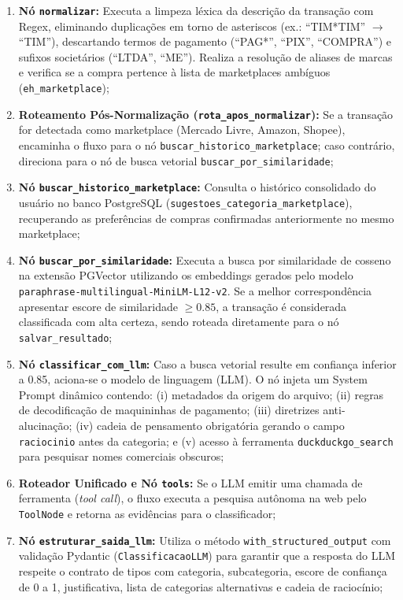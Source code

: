 \documentclass[
	12pt,				
	openright,			
	oneside,			
	a4paper,			
	english,			
	brazil				
	]{abntex2}
\begin{document}
\begin{enumerate}
    \item \textbf{Nó \texttt{normalizar}:} Executa a limpeza léxica da descrição da transação com Regex, eliminando duplicações em torno de asteriscos (ex.: ``TIM*TIM'' $\to$ ``TIM''), descartando termos de pagamento (``PAG*'', ``PIX'', ``COMPRA'') e sufixos societários (``LTDA'', ``ME''). Realiza a resolução de aliases de marcas e verifica se a compra pertence à lista de marketplaces ambíguos (\texttt{eh\_marketplace});
    \item \textbf{Roteamento Pós-Normalização (\texttt{rota\_apos\_normalizar}):} Se a transação for detectada como marketplace (Mercado Livre, Amazon, Shopee), encaminha o fluxo para o nó \texttt{buscar\_historico\_marketplace}; caso contrário, direciona para o nó de busca vetorial \texttt{buscar\_por\_similaridade};
    \item \textbf{Nó \texttt{buscar\_historico\_marketplace}:} Consulta o histórico consolidado do usuário no banco PostgreSQL (\texttt{sugestoes\_categoria\_marketplace}), recuperando as preferências de compras confirmadas anteriormente no mesmo marketplace;
    \item \textbf{Nó \texttt{buscar\_por\_similaridade}:} Executa a busca por similaridade de cosseno na extensão PGVector utilizando os embeddings gerados pelo modelo \texttt{paraphrase-multilingual-MiniLM-L12-v2}. Se a melhor correspondência apresentar escore de similaridade $\ge 0.85$, a transação é considerada classificada com alta certeza, sendo roteada diretamente para o nó \texttt{salvar\_resultado};
    \item \textbf{Nó \texttt{classificar\_com\_llm}:} Caso a busca vetorial resulte em confiança inferior a 0.85, aciona-se o modelo de linguagem (LLM). O nó injeta um System Prompt dinâmico contendo: (i) metadados da origem do arquivo; (ii) regras de decodificação de maquininhas de pagamento; (iii) diretrizes anti-alucinação; (iv) cadeia de pensamento obrigatória gerando o campo \texttt{raciocinio} antes da categoria; e (v) acesso à ferramenta \texttt{duckduckgo\_search} para pesquisar nomes comerciais obscuros;
    \item \textbf{Roteador Unificado e Nó \texttt{tools}:} Se o LLM emitir uma chamada de ferramenta (\textit{tool call}), o fluxo executa a pesquisa autônoma na web pelo \texttt{ToolNode} e retorna as evidências para o classificador;
    \item \textbf{Nó \texttt{estruturar\_saida\_llm}:} Utiliza o método \texttt{with\_structured\_output} com validação Pydantic (\texttt{ClassificacaoLLM}) para garantir que a resposta do LLM respeite o contrato de tipos com categoria, subcategoria, escore de confiança de 0 a 1, justificativa, lista de categorias alternativas e cadeia de raciocínio;

\end{enumerate}
\end{document}
